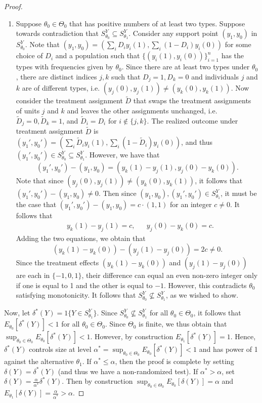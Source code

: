 \documentclass[12pt,reqno]{amsart}
\begin{document}
\begin{proof}
\begin{enumerate}
 \item [Case 2] Suppose $\theta_0 \in \Theta_0$ that has positive numbers of at least two
 types.
Suppose towards contradiction that $S^Y_{\theta_0} \subseteq S^Y_{\theta_1}$. Consider any support point $(y_1,y_0)$ in $S^Y_{\theta_0}$. Note that $(y_1,y_0) = (\sum_i D_i y_i(1), \sum_i (1-D_i) y_i(0))$ for some choice of $D_i$ and a population such that $\{(y_i(1),y_i(0)) \}_{i=1}^n$ has the types with frequencies given by $\theta_0$. Since there are at least two types under $\theta_0$, there are distinct indices $j,k$ such that $D_j =1, D_k =0$ and individuals $j$ and $k$ are of different types, i.e. $(y_j(0),y_j(1)) \neq (y_k(0),y_k(1))$. Now consider the treatment assignment $\tilde{D}$ that swaps the treatment assignments of units $j$ and $k$ and leaves the other assignments unchanged, i.e. $\tilde{D}_j =0, \tilde{D}_k = 1$, and $\tilde{D}_i = D_i$ for $i \not\in \{j,k\}$. The realized outcome under treatment assignment $\tilde{D}$ is $(y_1',y_0') = (\sum_i \tilde{D}_i y_i(1), \sum_i (1-\tilde{D}_i) y_i(0))$, and thus $(y_1',y_0') \in S^{Y}_{\theta_0} \subseteq S^{Y}_{\theta_1}$. However, we have that
$$(y_1',y_0') - (y_1,y_0) = (y_k(1) - y_j(1), y_j(0) - y_k(0) ) .$$
\noindent Note that since $(y_j(0),y_j(1)) \neq (y_k(0),y_k(1))$, it follows that $(y_1',y_0') - (y_1,y_0) \neq 0$. Then since $(y_1,y_0),(y_1',y_0') \in S^Y_{\theta_1}$, it must be the case that $(y_1',y_0') - (y_1,y_0) = c \cdot (1,1)$ for an integer $c \neq 0$. It follows that 
\begin{align*}
 & y_k(1) - y_j(1) = c,
 &
 & y_j(0) - y_k(0) = c.
\end{align*}
\noindent Adding the two equations, we obtain that 
$$(y_k(1) - y_k(0)) - (y_j(1)-y_j(0)) = 2c \neq 0 .$$
\noindent Since the treatment effects $(y_k(1) - y_k(0))$ and $(y_j(1)-y_j(0))$ are each in $\{-1,0,1\}$, their difference can equal an even non-zero integer only if one is equal to 1 and the other is equal to $-1$. However, this contradicts $\theta_0$ satisfying monotonicity. It follows that $S^Y_{\theta_0} \not\subseteq S^Y_{\theta_1}$, as we wished to show. 

\end{enumerate}

Now, let $\delta^*(Y) = 1\{ Y \in S^Y_{\theta_1} \}$. Since $S^Y_
{\theta_0} \not\subseteq S^Y_{\theta_1}$ for all $\theta_0 \in \Theta_0$, it follows that
$E_{\theta_0}[\delta^*(Y)] < 1$ for all $\theta_0 \in \Theta_0$. Since $\Theta_0$ is
finite, we thus obtain that $\sup_{\theta_0 \in \Theta_0} E_{\theta_0}[\delta^*(Y)] < 1$.
However, by construction $E_{\theta_1}[\delta^*(Y)] = 1$. Hence, $\delta^*(Y)$ controls
size at level $\alpha^* = \sup_{\theta_0 \in \Theta_0} E_{\theta_0}[\delta^*(Y)] < 1$ and
has power of 1 against the alternative $\theta_1$. If $\alpha^* \leq \alpha$, then the proof
is complete by setting $\delta(Y) = \delta^*(Y)$ (and thus we have a non-randomized
test). If $\alpha^* > \alpha$, set $\delta(Y) = \tfrac{\alpha}{\alpha^*} \delta^*
(Y)$. Then by construction $\sup_{\theta_0 \in \Theta_0} E_{\theta_0}[\delta
(Y)] = \alpha$ and $E_{\theta_1}[\delta(Y)] = \tfrac{\alpha}{\alpha^*} > \alpha$. 
\end{proof}
\end{document}
